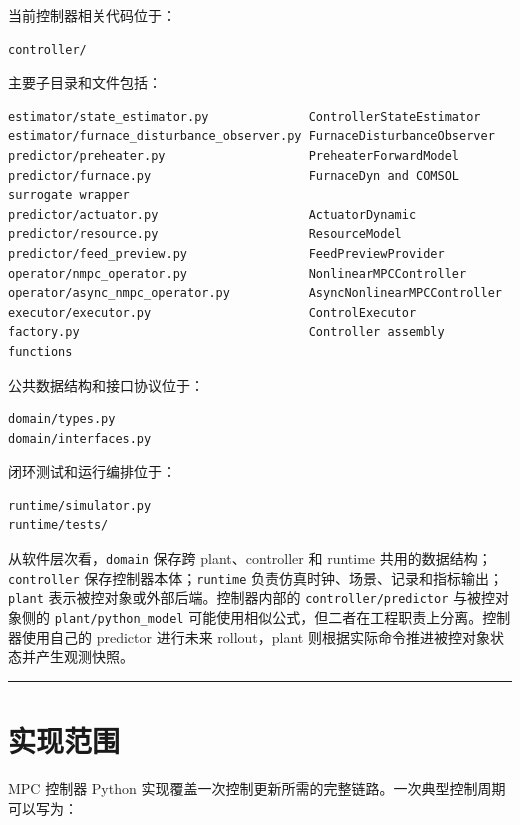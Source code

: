\documentclass[UTF8,openany,zihao=-4,oneside]{ctexbook}
\providecommand{\passthrough}[1]{#1}
\newcommand{\manualdivider}{\par\vspace{0.6em}\noindent\textcolor{FGLine}{\rule{\linewidth}{0.7pt}}\vspace{0.6em}\par}
\begin{document}
当前控制器相关代码位于：

\begin{lstlisting}
controller/
\end{lstlisting}

主要子目录和文件包括：

\begin{lstlisting}
estimator/state_estimator.py              ControllerStateEstimator
estimator/furnace_disturbance_observer.py FurnaceDisturbanceObserver
predictor/preheater.py                    PreheaterForwardModel
predictor/furnace.py                      FurnaceDyn and COMSOL surrogate wrapper
predictor/actuator.py                     ActuatorDynamic
predictor/resource.py                     ResourceModel
predictor/feed_preview.py                 FeedPreviewProvider
operator/nmpc_operator.py                 NonlinearMPCController
operator/async_nmpc_operator.py           AsyncNonlinearMPCController
executor/executor.py                      ControlExecutor
factory.py                                Controller assembly functions
\end{lstlisting}

公共数据结构和接口协议位于：

\begin{lstlisting}
domain/types.py
domain/interfaces.py
\end{lstlisting}

闭环测试和运行编排位于：

\begin{lstlisting}
runtime/simulator.py
runtime/tests/
\end{lstlisting}

从软件层次看，\passthrough{\lstinline!domain!} 保存跨 plant、controller 和 runtime 共用的数据结构；\passthrough{\lstinline!controller!} 保存控制器本体；\passthrough{\lstinline!runtime!} 负责仿真时钟、场景、记录和指标输出；\passthrough{\lstinline!plant!} 表示被控对象或外部后端。控制器内部的 \passthrough{\lstinline!controller/predictor!} 与被控对象侧的 \passthrough{\lstinline!plant/python_model!} 可能使用相似公式，但二者在工程职责上分离。控制器使用自己的 predictor 进行未来 rollout，plant 则根据实际命令推进被控对象状态并产生观测快照。

\manualdivider

\section{实现范围}\label{sec:controller-python-scope}

MPC 控制器 Python 实现覆盖一次控制更新所需的完整链路。一次典型控制周期可以写为：
\end{document}
